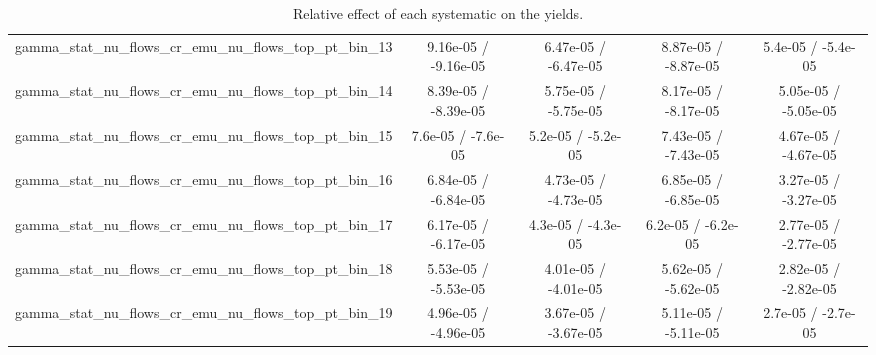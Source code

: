 \documentclass[10pt]{article}
\begin{document}
\begin{table}[htbp]
\begin{center}
\begin{tabular}{|c|c|c|c|c|}
  gamma_stat_nu_flows_cr_emu_nu_flows_top_pt_bin_13 & 9.16e-05 / -9.16e-05 & 6.47e-05 / -6.47e-05 & 8.87e-05 / -8.87e-05 & 5.4e-05 / -5.4e-05 \\ 
  gamma_stat_nu_flows_cr_emu_nu_flows_top_pt_bin_14 & 8.39e-05 / -8.39e-05 & 5.75e-05 / -5.75e-05 & 8.17e-05 / -8.17e-05 & 5.05e-05 / -5.05e-05 \\ 
  gamma_stat_nu_flows_cr_emu_nu_flows_top_pt_bin_15 & 7.6e-05 / -7.6e-05 & 5.2e-05 / -5.2e-05 & 7.43e-05 / -7.43e-05 & 4.67e-05 / -4.67e-05 \\ 
  gamma_stat_nu_flows_cr_emu_nu_flows_top_pt_bin_16 & 6.84e-05 / -6.84e-05 & 4.73e-05 / -4.73e-05 & 6.85e-05 / -6.85e-05 & 3.27e-05 / -3.27e-05 \\ 
  gamma_stat_nu_flows_cr_emu_nu_flows_top_pt_bin_17 & 6.17e-05 / -6.17e-05 & 4.3e-05 / -4.3e-05 & 6.2e-05 / -6.2e-05 & 2.77e-05 / -2.77e-05 \\ 
  gamma_stat_nu_flows_cr_emu_nu_flows_top_pt_bin_18 & 5.53e-05 / -5.53e-05 & 4.01e-05 / -4.01e-05 & 5.62e-05 / -5.62e-05 & 2.82e-05 / -2.82e-05 \\ 
  gamma_stat_nu_flows_cr_emu_nu_flows_top_pt_bin_19 & 4.96e-05 / -4.96e-05 & 3.67e-05 / -3.67e-05 & 5.11e-05 / -5.11e-05 & 2.7e-05 / -2.7e-05 \\ 
\hline 
\end{tabular} 
\caption{Relative effect of each systematic on the yields.} 
\end{center} 
\end{table} 
\end{document}
